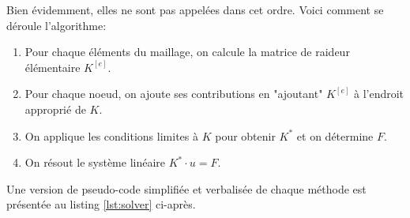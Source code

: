 \documentclass{article}
\begin{document}
Bien évidemment, elles ne sont pas appelées dans cet ordre. Voici
comment se déroule l'algorithme:

\begin{enumerate}
    \item Pour chaque éléments du maillage,
    on calcule la matrice de raideur élémentaire $K^{[e]}$.
    \item Pour chaque noeud, on ajoute ses contributions en "ajoutant" $K^{[e]}$ à l'endroit approprié de $K$.
    \item On applique les conditions limites à $K$ pour obtenir $K^*$ et on détermine $F$.
    \item On résout le système linéaire $K^* \cdot u = F$.
\end{enumerate}

Une version de pseudo-code simplifiée et verbalisée de chaque méthode 
est présentée au listing \ref{lst:solver} ci-après.

\newpage
\end{document}
